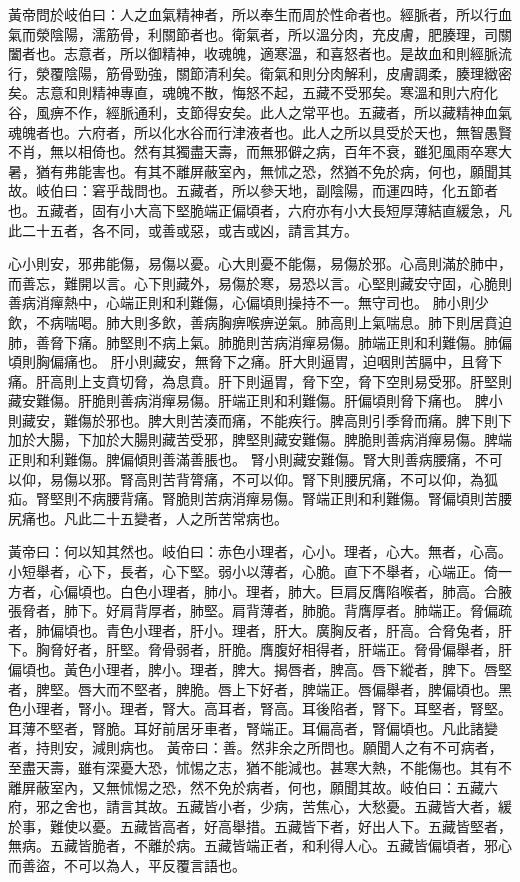 黃帝問於岐伯曰：人之血氣精神者，所以奉生而周於性命者也。經脈者，所以行血氣而滎陰陽，濡筋骨，利關節者也。衛氣者，所以溫分肉，充皮膚，肥腠理，司關闔者也。志意者，所以御精神，收魂魄，適寒溫，和喜怒者也。是故血和則經脈流行，滎覆陰陽，筋骨勁強，關節清利矣。衛氣和則分肉解利，皮膚調柔，腠理緻密矣。志意和則精神專直，魂魄不散，悔怒不起，五藏不受邪矣。寒溫和則六府化谷，風痹不作，經脈通利，支節得安矣。此人之常平也。五藏者，所以藏精神血氣魂魄者也。六府者，所以化水谷而行津液者也。此人之所以具受於天也，無智愚賢不肖，無以相倚也。然有其獨盡天壽，而無邪僻之病，百年不衰，雖犯風雨卒寒大暑，猶有弗能害也。有其不離屏蔽室內，無怵之恐，然猶不免於病，何也，願聞其故。岐伯曰：窘乎哉問也。五藏者，所以參天地，副陰陽，而運四時，化五節者也。五藏者，固有小大高下堅脆端正偏頃者，六府亦有小大長短厚薄結直緩急，凡此二十五者，各不同，或善或惡，或吉或凶，請言其方。

心小則安，邪弗能傷，易傷以憂。心大則憂不能傷，易傷於邪。心高則滿於肺中，而善忘，難開以言。心下則藏外，易傷於寒，易恐以言。心堅則藏安守固，心脆則善病消癉熱中，心端正則和利難傷，心偏頃則操持不一。無守司也。
肺小則少飲，不病喘喝。肺大則多飲，善病胸痹喉痹逆氣。肺高則上氣喘息。肺下則居賁迫肺，善脅下痛。肺堅則不病上氣。肺脆則苦病消癉易傷。肺端正則和利難傷。肺偏頃則胸偏痛也。
肝小則藏安，無脅下之痛。肝大則逼胃，迫咽則苦膈中，且脅下痛。肝高則上支賁切脅，為息賁。肝下則逼胃，脅下空，脅下空則易受邪。肝堅則藏安難傷。肝脆則善病消癉易傷。肝端正則和利難傷。肝偏頃則脅下痛也。
脾小則藏安，難傷於邪也。脾大則苦湊而痛，不能疾行。脾高則引季脅而痛。脾下則下加於大腸，下加於大腸則藏苦受邪，脾堅則藏安難傷。脾脆則善病消癉易傷。脾端正則和利難傷。脾偏傾則善滿善脹也。
腎小則藏安難傷。腎大則善病腰痛，不可以仰，易傷以邪。腎高則苦背膂痛，不可以仰。腎下則腰尻痛，不可以仰，為狐疝。腎堅則不病腰背痛。腎脆則苦病消癉易傷。腎端正則和利難傷。腎偏頃則苦腰尻痛也。凡此二十五變者，人之所苦常病也。

黃帝曰：何以知其然也。岐伯曰：赤色小理者，心小。理者，心大。無者，心高。小短舉者，心下，長者，心下堅。弱小以薄者，心脆。直下不舉者，心端正。倚一方者，心偏頃也。白色小理者，肺小。理者，肺大。巨肩反膺陷喉者，肺高。合腋張脅者，肺下。好肩背厚者，肺堅。肩背薄者，肺脆。背膺厚者。肺端正。脅偏疏者，肺偏頃也。青色小理者，肝小。理者，肝大。廣胸反者，肝高。合脅兔者，肝下。胸脅好者，肝堅。脅骨弱者，肝脆。膺腹好相得者，肝端正。脅骨偏舉者，肝偏頃也。黃色小理者，脾小。理者，脾大。揭唇者，脾高。唇下縱者，脾下。唇堅者，脾堅。唇大而不堅者，脾脆。唇上下好者，脾端正。唇偏舉者，脾偏頃也。黑色小理者，腎小。理者，腎大。高耳者，腎高。耳後陷者，腎下。耳堅者，腎堅。耳薄不堅者，腎脆。耳好前居牙車者，腎端正。耳偏高者，腎偏頃也。凡此諸變者，持則安，減則病也。
黃帝曰：善。然非余之所問也。願聞人之有不可病者，至盡天壽，雖有深憂大恐，怵惕之志，猶不能減也。甚寒大熱，不能傷也。其有不離屏蔽室內，又無怵惕之恐，然不免於病者，何也，願聞其故。岐伯曰：五藏六府，邪之舍也，請言其故。五藏皆小者，少病，苦焦心，大愁憂。五藏皆大者，緩於事，難使以憂。五藏皆高者，好高舉措。五藏皆下者，好出人下。五藏皆堅者，無病。五藏皆脆者，不離於病。五藏皆端正者，和利得人心。五藏皆偏頃者，邪心而善盜，不可以為人，平反覆言語也。

